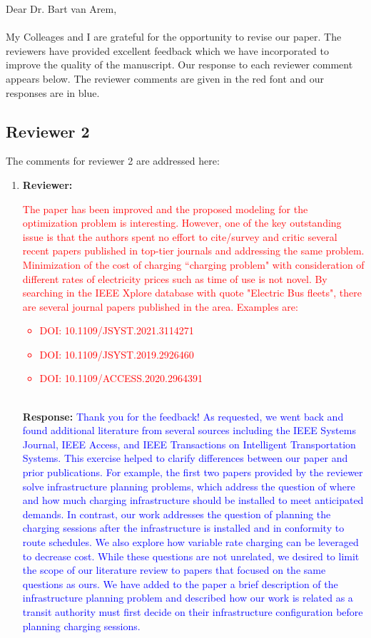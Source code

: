 \documentclass{article}
\newcommand\formatfeedback[2]
{%
	\textbf{Reviewer:} \textcolor{red}{#1} 
	\leavevmode\\[0.1in] \textbf{Response:} \textcolor{blue}{#2}
}
\begin{document}
\noindent Dear Dr. Bart van Arem, \\ \\
My Colleages and I are grateful for the opportunity to revise our paper. The reviewers have provided excellent feedback which we have incorporated to improve the quality of the manuscript. Our response to each reviewer comment appears below. The reviewer comments are given in the red font and our responses are in blue.

\subsection*{Reviewer 2}
The comments for reviewer 2 are addressed here:
\begin{enumerate}
	\item \formatfeedback{The paper has been improved and the proposed modeling for the optimization problem is interesting. However, one of the key outstanding issue is that the authors spent no effort to cite/survey and critic several recent papers published in top-tier journals and addressing the same problem. Minimization of the cost of charging ``charging problem" with consideration of different rates of electricity prices such as time of use is not novel. By searching in the IEEE Xplore database with quote "Electric Bus fleets", there are several journal papers published in the area. Examples are:
\begin{itemize}
	\item DOI: 10.1109/JSYST.2021.3114271
	\item DOI: 10.1109/JSYST.2019.2926460
	\item DOI: 10.1109/ACCESS.2020.2964391
\end{itemize}
}{Thank you for the feedback! As requested, we went back and found additional literature from several sources including the IEEE Systems Journal, IEEE Access, and IEEE Transactions on Intelligent Transportation Systems. This exercise helped to clarify differences between our paper and prior publications. For example, the first two papers provided by the reviewer solve infrastructure planning problems, which address the question of where and how much charging infrastructure should be installed to meet anticipated demands. In contrast, our work addresses the question of planning the charging sessions after the infrastructure is installed and in conformity to route schedules.  We also explore how variable rate charging can be leveraged to decrease cost. While these questions are not unrelated, we desired to limit the scope of our literature review to papers that focused on the same questions as ours. We have added to the paper a brief description of the infrastructure planning problem and described how our work is related as a transit authority must first decide on their infrastructure configuration before planning charging sessions.}

\end{enumerate}
\end{document}

